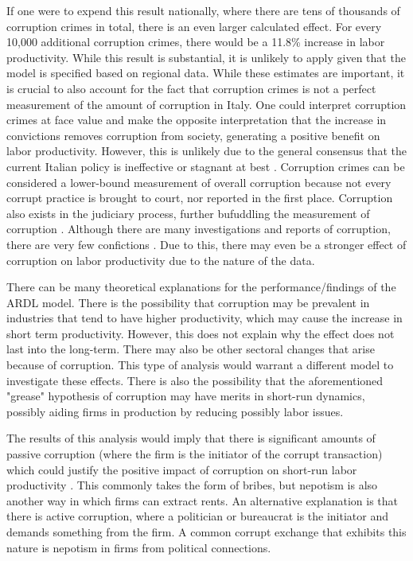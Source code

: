 \documentclass[12pt]{article} %
\begin{document}
If one were to expend this result nationally, where there are tens of thousands of corruption crimes in total, there is an even larger calculated effect. For every 10,000 additional corruption crimes, there would be a 11.8\% increase in labor productivity. While this result is substantial, it is unlikely to apply given that the model is specified based on regional data. While these estimates are important, it is crucial to also account for the fact that corruption crimes is not a perfect measurement of the amount of corruption in Italy. One could interpret corruption crimes at face value and make the opposite interpretation that the increase in convictions removes corruption from society, generating a positive benefit on labor productivity. However, this is unlikely due to the general consensus that the current Italian policy is ineffective or stagnant at best \citep{woodhouse_accountability_2022, della_porta_politics_1994, daniele_never_2023}. Corruption crimes can be considered a lower-bound measurement of overall corruption because not every corrupt practice is brought to court, nor reported in the first place. Corruption also exists in the judiciary process, further bufuddling the measurement of corruption \citep{della_porta_judges_2001, alberti_political_1995}. Although there are many investigations and reports of corruption, there are very few confictions \citep{guarnieri_political_2021}. Due to this, there may even be a stronger effect of corruption on labor productivity due to the nature of the data.

There can be many theoretical explanations for the performance/findings of the ARDL model.  There is the possibility that corruption may be prevalent in industries that tend to have higher productivity, which may cause the increase in short term productivity. However, this does not explain why the effect does not last into the long-term. There may also be other sectoral changes that arise because of corruption. This type of analysis would warrant a different model to investigate these effects. There is also the possibility that the aforementioned "grease" hypothesis of corruption may have merits in short-run dynamics, possibly aiding firms in production by reducing possibly labor issues.

The results of this analysis would imply that there is significant amounts of passive corruption (where the firm is the initiator of the corrupt transaction) which could justify the positive impact of corruption on short-run labor productivity \citep{capasso_corruption_2022}. This commonly takes the form of bribes, but nepotism is also another way in which firms can extract rents. An alternative explanation is that there is active corruption, where a politician or bureaucrat is the initiator and demands something from the firm. A common corrupt exchange that exhibits this nature is nepotism in firms from political connections. 
\end{document}
